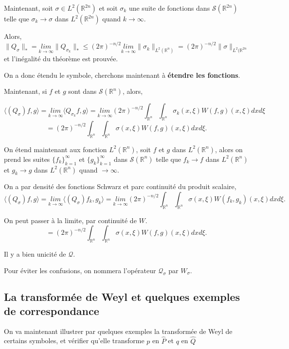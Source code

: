 \documentclass[a4paper, 12pt]{report}
\newcommand{\R}{\mathbb{R}} %
\newcommand{\ra}[1][]{\overset{#1}{\rightarrow}} %
\renewcommand{\.}{\cdot} %
\theoremstyle{break}
\theoremstyle{remark}
\theoremstyle{proofstyle}
\begin{document}
\begin{preuve}
    Maintenant, soit $\sigma \in L^2(\R^{2n})$ et soit $\sigma _k$ une suite de fonctions dans $\mathcal{S}(\R^{2n})$ telle que $\sigma _k \ra \sigma$ dans $L^2(\R^{2n})$ quand $k \ra \infty$.\vspace{5pt}

    Alors,
    $$\|Q_\sigma\|_* = \underset{k \ra \infty}{lim} \|Q_{\sigma_k}\|_* \leq  (2 \pi)^{-n/2}  \underset{k \ra \infty}{lim} \| \sigma_k \|_{L^2(\R^n)} = (2 \pi)^{-n/2} \|\sigma\|_{L^2(\R^{2n}}$$ et l'inégalité du théorème est prouvée.

    On a donc étendu le symbole, cherchons maintenant à \textbf{étendre les fonctions}.

    Maintenant, si $f$ et $g$ sont dans $\mathcal{S}(\R^n)$, alors,

    $$\langle ( Q_ \sigma)f, g \rangle = \underset{k \ra \infty}{lim} \langle  Q_{\sigma_k}f, g \rangle = \underset{k \ra \infty}{lim} (2 \pi)^{-n/2} \int_{\R^n} \int_{\R^n} \sigma_k (x, \xi) W(f,g) (x, \xi) dx d\xi$$
    $$=(2 \pi)^{-n/2} \int_{\R^n} \int_{\R^n} \sigma (x, \xi) W(f,g) (x, \xi) dx d\xi.$$

    On étend maintenant aux fonction $L^2(\R^n)$, soit $f$ et $g$ dans $L^2(\R^n)$, alors on prend les suites $\{f_k\}_{k=1}^\infty$ et $\{g_k\}_{k=1}^\infty$ dans $\mathcal{S}(\R^n)$ telle que $f_k \ra f$ dans $L^2(\R^n)$ et $g_k \ra g$ dans $L^2(\R^n)$ quand $\ra \infty$.

    On a par densité des fonctions Schwarz et parc continuité du produit scalaire,
    $$\langle (Q_\sigma)f,g \rangle = \underset{k \ra \infty}{lim} \langle (Q _\sigma)f_k, g_k \rangle = \underset{k \ra \infty}{lim} (2 \pi)^{-n/2} \int_{\R^n} \int_{\R^n} \sigma(x, \xi) W(f_k, g_k)(x, \xi) dx d\xi.$$

    On peut passer à la limite, par continuité de $W$.
    $$=(2 \pi)^{-n/2} \int_{\R^n} \int_{\R^n} \sigma(x, \xi) W(f, g)(x, \xi) dx d\xi.$$

    Il y a bien unicité de $\mathcal{Q}$.
\end{preuve}

Pour éviter les confusions, on nommera l'opérateur $\mathcal{Q}_\sigma$ par $W_\sigma$.

\subsection{La transformée de Weyl et quelques exemples de correspondance}

On va maintenant illustrer par quelques exemples la transformée de Weyl de certains symboles, et vérifier qu'elle transforme $p$ en $\hat{P}$ et $q$ en $\hat{Q}$
\end{document}
